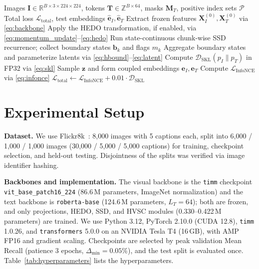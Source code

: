 \documentclass[runningheads,a4paper]{llncs}
\begin{document}
\begin{algorithm}[!htbp]
\caption{HEDO-HVSC forward pass and training step}
\label{alg:hedo_hvsc}
\begin{algorithmic}[1]
\Require Images $\mathbf{I} \in \mathbb{R}^{B \times 3 \times 224 \times 224}$, tokens $\mathbf{T} \in \mathbb{Z}^{B \times 64}$, masks $\mathbf{M}_T$, positive index sets $\mathcal{P}$
\Ensure Total loss $\mathcal{L}_{\text{total}}$, test embeddings $\hat{\mathbf{e}}_I, \hat{\mathbf{e}}_T$
\State Extract frozen features $\mathbf{X}_I^{(0)}, \mathbf{X}_T^{(0)}$ via \eqref{eq:backbone}
\State Apply the HEDO transformation, if enabled, via \eqref{eq:momentum_update}--\eqref{eq:hedo}
\State Run state-continuous chunk-wise SSD recurrence; collect boundary states $\mathbf{b}_k$ and flags $m_k$
\State Aggregate boundary states and parameterize latents via \eqref{eq:hbound}--\eqref{eq:latent}
\State Compute $\mathcal{D}_{\text{SKL}}(p_I \parallel p_T)$ in FP32 via \eqref{eq:skl}
\State Sample $\mathbf{z}$ and form coupled embeddings $\mathbf{e}_I, \mathbf{e}_T$
\State Compute $\mathcal{L}_{\text{InfoNCE}}$ via \eqref{eq:infonce}
\State \Return $\mathcal{L}_{\text{total}} \gets \mathcal{L}_{\text{InfoNCE}} + 0.01 \cdot \mathcal{D}_{\text{SKL}}$
\end{algorithmic}
\end{algorithm}

\section{Experimental Setup}
\label{sec:experimental_setup}

\textbf{Dataset.} We use Flickr8k~\cite{hodosh2013framing}: 8,000 images with 5 captions each, split into 6,000 / 1,000 / 1,000 images (30,000 / 5,000 / 5,000 captions) for training, checkpoint selection, and held-out testing. Disjointness of the splits was verified via image identifier hashing.

\textbf{Backbones and implementation.} The visual backbone is the \texttt{timm} checkpoint \texttt{vit\_base\_}\allowbreak\texttt{patch16\_224} (86.6\,M parameters, ImageNet normalization) and the text backbone is \texttt{roberta-base} (124.6\,M parameters, $L_T=64$); both are frozen, and only projections, HEDO, SSD, and HVSC modules (0.330--0.422\,M parameters) are trained. We use Python 3.12, PyTorch 2.10.0 (CUDA 12.8), \texttt{timm} 1.0.26, and \texttt{transformers} 5.0.0 on an NVIDIA Tesla T4 (16\,GB), with AMP FP16 and gradient scaling. Checkpoints are selected by peak validation Mean Recall (patience 3 epochs, $\Delta_{\text{min}}=0.05\%$), and the test split is evaluated once. Table~\ref{tab:hyperparameters} lists the hyperparameters.
\end{document}
